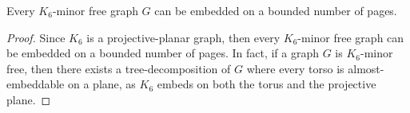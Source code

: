 \begin{corollary}
	Every $K_6$-minor free graph $G$ can be embedded on a bounded number of pages.
\end{corollary}

\begin{proof}
	Since $K_6$ is a projective-planar graph, then every $K_6$-minor free graph can be embedded on a bounded number of pages. In fact, if a graph $G$ is $K_6$-minor free, then there exists a tree-decomposition of $G$ where every torso is almost-embeddable on a plane, as $K_6$ embeds on both the torus and the projective plane. 
\end{proof}